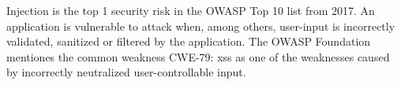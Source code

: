 
Injection is the top 1 security risk in the OWASP Top 10 list from 2017.
An application is vulnerable to attack when, among others, user-input is incorrectly validated, sanitized or filtered by the application.
The OWASP Foundation mentiones the common weakness CWE-79: \acrfull{xss} as one of the weaknesses caused by incorrectly neutralized user-controllable input. \cite{OWASP/Risks2017,OWASP/Injection}
